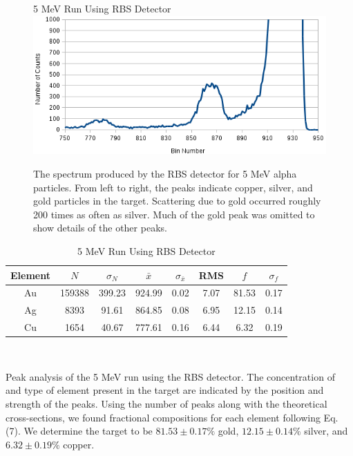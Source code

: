 \documentclass[10pt]{IEEEtran}
\begin{document}
\begin{figure}[!hbt]
       \begin{center}
       5 MeV Run Using RBS Detector
       \includegraphics[width=\columnwidth]{5mevrbs}
       \caption{The spectrum produced by the RBS detector for 5 MeV alpha particles. From left to right, the peaks indicate copper, silver, and gold particles in the target. Scattering due to gold occurred roughly 200 times as often as silver. Much of the gold peak was omitted to show details of the other peaks.}
       \label{fig:5RBS}
       \end{center}
\end{figure}

     \begin{table}[!hbt]
        \begin{center}
        \caption{5 MeV Run Using RBS Detector}
        \label{tab:5RBS}
        \begin{tabular}{c|ccccccc}
             Element & $N$ & $\sigma_N$ & $\bar{x}$ & $\sigma_{\bar{x}}$ & RMS & $f$ & $\sigma_f$\\
             \hline\hline
			Au & 159388 & 399.23 & 924.99 & 0.02 & 7.07 & 81.53 & 0.17 \\
			Ag & 8393 & 91.61 & 864.85 & 0.08 & 6.95 & 12.15 & 0.14 \\
			Cu & 1654 & 40.67 & 777.61 & 0.16 & 6.44 & 6.32 & 0.19 \\
			\hline
        \end{tabular}\\
        \end{center}
                Peak analysis of the 5 MeV run using the RBS detector. The concentration of and type of element present in the target are indicated by the position and strength of the peaks. Using the number of peaks along with the theoretical cross-sections, we found fractional compositions for each element following Eq. (7). We determine the target to be $81.53\pm0.17\%$ gold, $12.15\pm0.14\%$ silver, and $6.32\pm0.19\%$ copper.
    \end{table}
    
\end{document}
